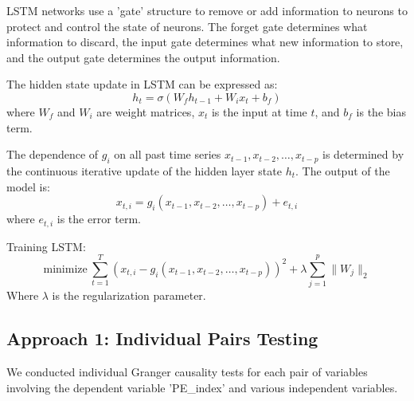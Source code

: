 \documentclass[11pt]{article}
\begin{document}
LSTM networks use a 'gate' structure to remove or add information to neurons to protect and control the state of neurons. The forget gate determines what information to discard, the input gate determines what new information to store, and the output gate determines the output information.

The hidden state update in LSTM can be expressed as:
\begin{equation}
h_t = \sigma(W_f h_{t-1} + W_i x_t + b_f)
\end{equation}
where \( W_f \) and \( W_i \) are weight matrices, \( x_t \) is the input at time \( t \), and \( b_f \) is the bias term.

The dependence of \( g_i \) on all past time series \( x_{t-1}, x_{t-2}, \ldots, x_{t-p} \) is determined by the continuous iterative update of the hidden layer state \( h_t \). The output of the model is:
\begin{equation}
x_{t,i} = g_i(x_{t-1}, x_{t-2}, \ldots, x_{t-p}) + e_{t,i}
\end{equation}
where \( e_{t,i} \) is the error term.

Training LSTM:
\begin{equation}
\text{minimize} \ \sum_{t=1}^T \left( x_{t,i} - g_i(x_{t-1}, x_{t-2}, \ldots, x_{t-p}) \right)^2 + \lambda \sum_{j=1}^{p} \|W_j\|_2
\end{equation}
Where \( \lambda \) is the regularization parameter.

\subsection{Approach 1: Individual Pairs Testing}

We conducted individual Granger causality tests for each pair of variables involving the dependent variable 'PE\_index' and various independent variables.
\end{document}
